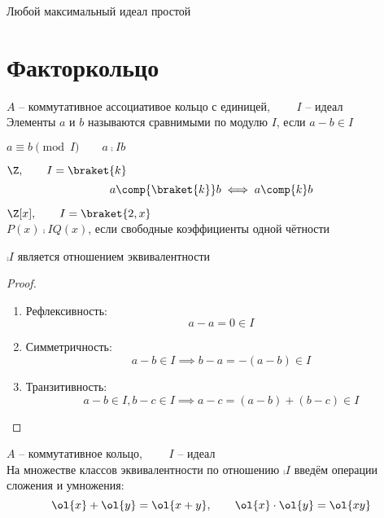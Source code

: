 \begin{remark}
	Любой максимальный идеал простой
\end{remark}

\section{Факторкольцо}

\begin{definition}
	$ A $ -- коммутативное ассоциативое кольцо с единицей, $ \qquad I $ -- идеал \\
	Элементы $ a $ и $ b $ называются сравнимыми по модулю $ I $, если $ a - b \in I $
\end{definition}

\begin{notation}
	$ a \equiv b \pmod I \qquad a \comp{I} b $
\end{notation}

\begin{exmpls}
	\item $ \Z, \qquad I = \braket{k} $
	$$ a \comp{\braket{k}} b \iff a \comp{k} b $$
	\item $ \Z[x], \qquad I = \braket{2, x} $ \\
	$ P(x) \comp{I} Q(x) $, если свободные коэффициенты одной чётности
\end{exmpls}

\begin{property}
	$ \comp{I} $ является отношением эквивалентности
\end{property}

\begin{proof}
	\hfill
	\begin{enumerate}
		\item Рефлексивность:
		$$ a - a = 0 \in I $$
		\item Симметричность:
		$$ a - b \in I \implies b - a = -(a - b) \in I $$
		\item Транзитивность:
		$$ a - b \in I, b - c \in I \implies a - c = (a - b) + (b - c) \in I $$
	\end{enumerate}
\end{proof}

\begin{definition}
	$ A $ -- коммутативное кольцо, $ \qquad I $ -- идеал \\
	На множестве классов эквивалентности по отношению $ \comp{I} $ введём операции сложения и умножения:
	$$ \ol{x} + \ol{y} = \ol{x + y}, \qquad \ol{x} \cdot \ol{y} = \ol{xy} $$
\end{definition}

